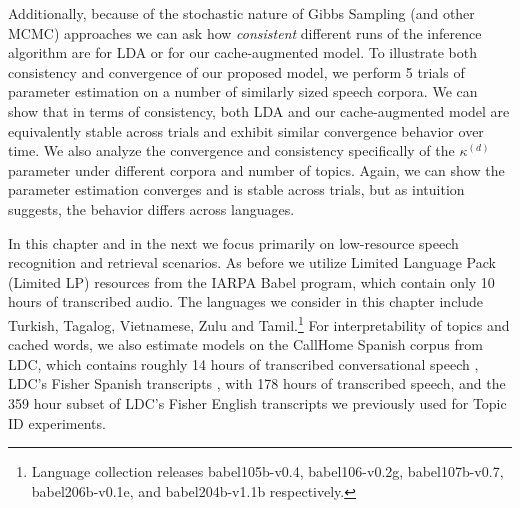 Additionally, because of the stochastic nature of Gibbs Sampling (and other MCMC) approaches we can ask how \textit{consistent} different runs of the inference algorithm are for LDA or for our cache-augmented model.  To illustrate  both consistency and convergence of our proposed model, we perform 5 trials of parameter estimation on a number of similarly sized speech corpora.  We can show that in terms of consistency, both LDA and our cache-augmented model are equivalently stable across trials and exhibit similar convergence behavior over time.  We also analyze the convergence and consistency specifically of the $\kappa^{(d)}$ parameter under different corpora and number of topics.  Again, we can show the parameter estimation converges and is stable across trials, but as intuition suggests, the behavior differs across languages.

In this chapter and in the next we focus primarily on low-resource speech recognition and retrieval scenarios.  As before we utilize Limited Language Pack (Limited LP) resources from the IARPA {\small Babel} program, which contain only 10 hours of transcribed audio.  The languages we consider in this chapter include Turkish, Tagalog, Vietnamese, Zulu and Tamil.\footnote{Language collection releases babel105b-v0.4, babel106-v0.2g, babel107b-v0.7, babel206b-v0.1e, and babel204b-v1.1b respectively.}  
For interpretability of topics and cached words, we also estimate models on the CallHome Spanish corpus from LDC, which contains roughly 14 hours of transcribed conversational speech \cite{callhome}, LDC's Fisher Spanish transcripts \cite{ldc2010}, with 178 hours of transcribed speech, and the 359 hour subset of LDC's Fisher English transcripts we previously used for Topic ID experiments.

